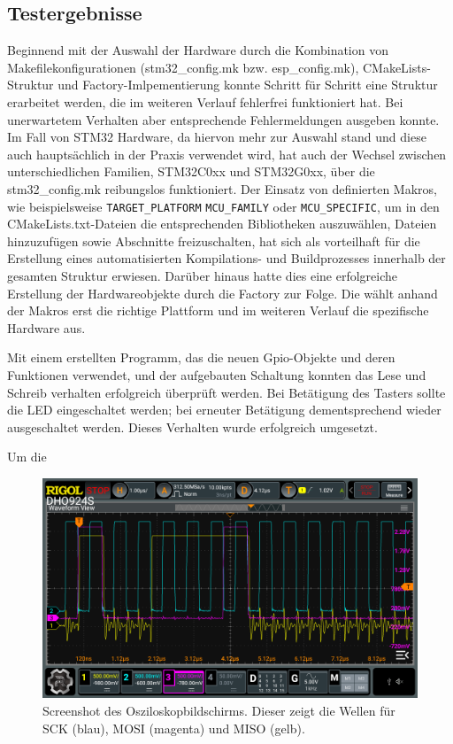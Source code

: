 \subsection{Testergebnisse}
Beginnend mit der Auswahl der Hardware durch die Kombination von Makefilekonfigurationen (stm32\_config.mk bzw. esp\_config.mk), CMakeLists-Struktur und Factory-Imlpementierung konnte Schritt für Schritt eine Struktur erarbeitet werden, die im weiteren Verlauf fehlerfrei funktioniert hat.
Bei unerwartetem Verhalten aber entsprechende Fehlermeldungen ausgeben konnte.
Im Fall von STM32 Hardware, da hiervon mehr zur Auswahl stand und diese auch hauptsächlich in der Praxis verwendet wird, hat auch der Wechsel zwischen unterschiedlichen Familien, STM32C0xx und STM32G0xx, über die stm32\_config.mk reibungslos funktioniert.
Der Einsatz von definierten Makros, wie beispielsweise \texttt{TARGET\_PLATFORM} \texttt{MCU\_FAMILY} oder \texttt{MCU\_SPECIFIC}, um in den CMakeLists.txt-Dateien die entsprechenden Bibliotheken auszuwählen, Dateien hinzuzufügen sowie Abschnitte freizuschalten, hat sich als vorteilhaft für die Erstellung eines automatisierten Kompilations- und Buildprozesses innerhalb der gesamten Struktur erwiesen.
Darüber hinaus hatte dies eine erfolgreiche Erstellung der Hardwareobjekte durch die Factory zur Folge.
Die wählt anhand der Makros erst die richtige Plattform und im weiteren Verlauf die spezifische Hardware aus.

Mit einem erstellten Programm, das die neuen Gpio-Objekte und deren Funktionen verwendet, und der aufgebauten Schaltung konnten das Lese und Schreib verhalten erfolgreich überprüft werden.
Bei Betätigung des Tasters sollte die LED eingeschaltet werden; bei erneuter Betätigung dementsprechend wieder ausgeschaltet werden.
Dieses Verhalten wurde erfolgreich umgesetzt.

Um die
\begin{figure}[H]
	\includegraphics[width=\textwidth]{Pics/oszi_cube_spi_example.png}
	\caption{Screenshot des Osziloskopbildschirms. Dieser zeigt die Wellen für SCK (blau), MOSI (magenta) und MISO (gelb).}
	\label{fig:oszi_cube_spi_example}
\end{figure}

